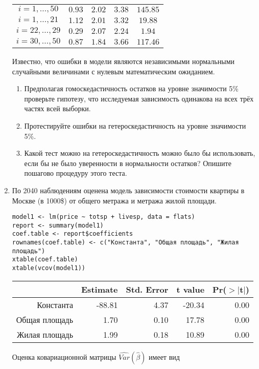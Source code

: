 \documentclass[12pt, a4paper]{article}
\theoremstyle{definition}
\begin{document}
\begin{enumerate}
\begin{tabular}{c|cccc}
\hline
$i=1,\ldots, 50$ & $0.93$ & $2.02$ & $3.38$ & $145.85$ \\
$i=1,\ldots, 21$ & $1.12$ & $2.01$ & $3.32$ & $19.88$ \\
$i=22,\ldots, 29$ & $0.29$ & $2.07$ & $2.24$ & $1.94$ \\
$i=30,\ldots, 50$ & $0.87$ & $1.84$ & $3.66$ & $117.46$ \\
\end{tabular}

Известно, что ошибки в модели являются независимыми нормальными случайными величинами с нулевым математическим ожиданием.

\begin{enumerate}
\item Предполагая гомоскедастичность остатков на уровне значимости 5\% проверьте гипотезу, что исследуемая зависимость одинакова на всех трёх частях всей выборки.
\item Протестируйте ошибки на гетероскедастичность на уровне значимости 5\%.
\item Какой тест можно на гетероскедастичность можно было бы использовать, если бы не было уверенности в нормальности остатков? Опишите пошагово процедуру этого теста.
\end{enumerate}


\item По 2040 наблюдениям оценена модель зависимости стоимости квартиры в Москве (в 1000\$) от общего метража и метража жилой площади.
\begin{verbatim}
model1 <- lm(price ~ totsp + livesp, data = flats)
report <- summary(model1)
coef.table <- report$coefficients
rownames(coef.table) <- c("Константа", "Общая площадь", "Жилая площадь")
xtable(coef.table)
xtable(vcov(model1))
\end{verbatim}

\begin{tabular}{rrrrr}
  \hline
 & Estimate & Std. Error & t value & Pr($>$$|$t$|$) \\
  \hline
Константа & -88.81 & 4.37 & -20.34 & 0.00 \\
  Общая площадь & 1.70 & 0.10 & 17.78 & 0.00 \\
  Жилая площадь & 1.99 & 0.18 & 10.89 & 0.00 \\
   \hline
\end{tabular}


Оценка ковариационной матрицы $\widehat{Var}(\hat{\beta})$ имеет вид



\end{enumerate}
\end{document}
